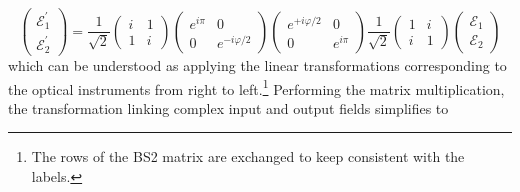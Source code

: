 \begin{equation}
    \begin{pmatrix}
        \mathcal{E}_1^\prime
        \\
        \mathcal{E}_2^\prime
    \end{pmatrix}
    =
    \frac{1}{\sqrt{2}}
    \begin{pmatrix}
        i & 1
        \\
        1 & i
    \end{pmatrix}
    \begin{pmatrix}
        e^{i\pi} & 0
        \\
        0 & e^{-i\varphi/2}
    \end{pmatrix}
        \begin{pmatrix}
        e^{+i\varphi/2} & 0
        \\
        0 & e^{i\pi}
    \end{pmatrix}
    \frac{1}{\sqrt{2}}
    \begin{pmatrix}
        1 & i
        \\
        i & 1
    \end{pmatrix}
    \begin{pmatrix}
        \mathcal{E}_1
        \\
        \mathcal{E}_2
    \end{pmatrix}
    \label{eq:mzm_transform}
\end{equation}
which can be understood as applying the linear transformations corresponding to the optical instruments from right to left.\footnote{The rows of the BS2 matrix are exchanged to keep consistent with the labels.}
Performing the matrix multiplication, the transformation linking complex input and output fields simplifies to
